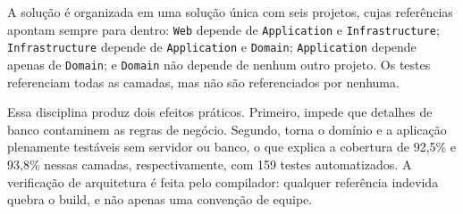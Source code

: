 A solução é organizada em uma solução única com seis projetos, cujas referências
apontam sempre para dentro: \texttt{Web} depende de \texttt{Application} e
\texttt{Infrastructure}; \texttt{Infrastructure} depende de
\texttt{Application} e \texttt{Domain}; \texttt{Application} depende apenas de
\texttt{Domain}; e \texttt{Domain} não depende de nenhum outro projeto. Os
testes referenciam todas as camadas, mas não são referenciados por nenhuma.

Essa disciplina produz dois efeitos práticos. Primeiro, impede que detalhes de
banco contaminem as regras de negócio. Segundo, torna o domínio e a aplicação
plenamente testáveis sem servidor ou banco, o que explica a cobertura de 92,5\%
e 93,8\% nessas camadas, respectivamente, com 159 testes automatizados. A
verificação de arquitetura é feita pelo compilador: qualquer referência
indevida quebra o build, e não apenas uma convenção de equipe.

